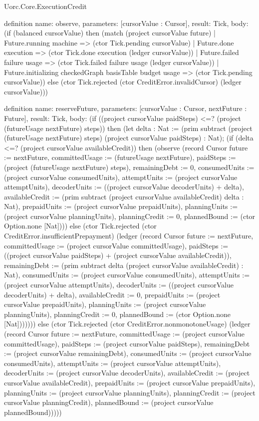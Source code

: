 \begin{lexlean}{Uorc.Core.ExecutionCredit}
\begin{semanticmodule}
definition{
  name: observe,
  parameters: [cursorValue : Cursor],
  result: Tick,
  body: (if (balanced cursorValue) then (match (project cursorValue future)
    | Future.running machine => (ctor Tick.pending cursorValue)
    | Future.done execution => (ctor Tick.done execution (ledger cursorValue))
    | Future.failed failure usage => (ctor Tick.failed failure usage (ledger cursorValue))
    | Future.initializing checkedGraph basisTable budget usage => (ctor Tick.pending cursorValue)) else (ctor Tick.rejected (ctor CreditError.invalidCursor) (ledger cursorValue)))
}

definition{
  name: reserveFuture,
  parameters: [cursorValue : Cursor, nextFuture : Future],
  result: Tick,
  body: (if ((project cursorValue paidSteps) <=? (project (futureUsage nextFuture) steps)) then (let delta : Nat := (prim subtract (project (futureUsage nextFuture) steps) (project cursorValue paidSteps) : Nat); (if (delta <=? (project cursorValue availableCredit)) then (observe (record Cursor {future := nextFuture, committedUsage := (futureUsage nextFuture), paidSteps := (project (futureUsage nextFuture) steps), remainingDebt := 0, consumedUnits := (project cursorValue consumedUnits), attemptUnits := (project cursorValue attemptUnits), decoderUnits := ((project cursorValue decoderUnits) + delta), availableCredit := (prim subtract (project cursorValue availableCredit) delta : Nat), prepaidUnits := (project cursorValue prepaidUnits), planningUnits := (project cursorValue planningUnits), planningCredit := 0, plannedBound := (ctor Option.none [Nat])})) else (ctor Tick.rejected (ctor CreditError.insufficientPrepayment) (ledger (record Cursor {future := nextFuture, committedUsage := (project cursorValue committedUsage), paidSteps := ((project cursorValue paidSteps) + (project cursorValue availableCredit)), remainingDebt := (prim subtract delta (project cursorValue availableCredit) : Nat), consumedUnits := (project cursorValue consumedUnits), attemptUnits := (project cursorValue attemptUnits), decoderUnits := ((project cursorValue decoderUnits) + delta), availableCredit := 0, prepaidUnits := (project cursorValue prepaidUnits), planningUnits := (project cursorValue planningUnits), planningCredit := 0, plannedBound := (ctor Option.none [Nat])}))))) else (ctor Tick.rejected (ctor CreditError.nonmonotoneUsage) (ledger (record Cursor {future := nextFuture, committedUsage := (project cursorValue committedUsage), paidSteps := (project cursorValue paidSteps), remainingDebt := (project cursorValue remainingDebt), consumedUnits := (project cursorValue consumedUnits), attemptUnits := (project cursorValue attemptUnits), decoderUnits := (project cursorValue decoderUnits), availableCredit := (project cursorValue availableCredit), prepaidUnits := (project cursorValue prepaidUnits), planningUnits := (project cursorValue planningUnits), planningCredit := (project cursorValue planningCredit), plannedBound := (project cursorValue plannedBound)}))))
}


\end{semanticmodule}
\end{lexlean}
